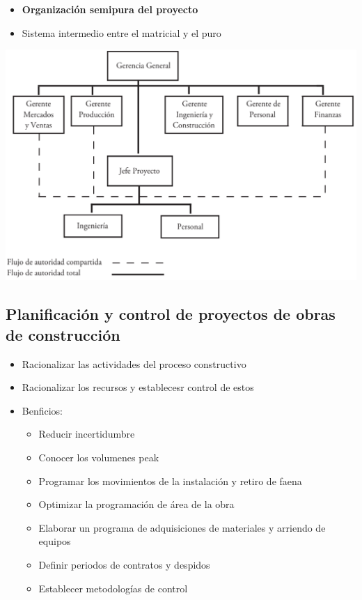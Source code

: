 \documentclass{article} %
\begin{document}
\begin{minipage}{0.45\textwidth}
    \begin{itemize}
        \item \textbf{Organización semipura del proyecto}
        \item Sistema intermedio entre el matricial y el puro

    \end{itemize}
\end{minipage}
\hfill
\begin{minipage}{0.5\textwidth}
    \centering
    \includegraphics[width=1\textwidth]{org_semipura_proyecto.png}
\end{minipage}

\newpage

\subsection{Planificación y control de proyectos de obras de construcción}  
\begin{itemize}
    \item Racionalizar las actividades del proceso constructivo
    \item Racionalizar los recursos y establecesr control de estos
    \item Benficios:
    \begin{itemize}
        \item Reducir incertidumbre
        \item Conocer los volumenes peak
        \item Programar los movimientos de la instalación y retiro de faena 
        \item Optimizar la programación de área de la obra
        \item Elaborar un programa de adquisiciones de materiales y arriendo de equipos
        \item Definir periodos de contratos y despidos
        \item Establecer metodologías de control
    \end{itemize}
\end{itemize}
\end{document}
